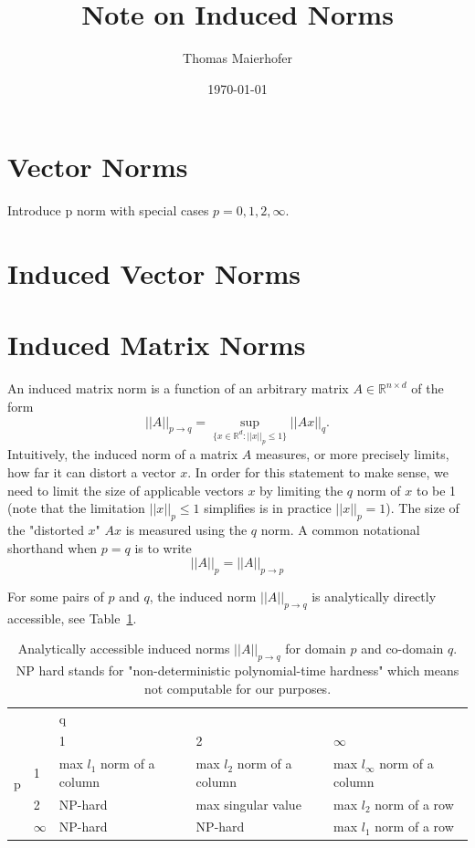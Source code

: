 \documentclass{article}
\title{Note on Induced Norms}
\author{Thomas Maierhofer}
\date{\today}
\begin{document}
\newcommand{\Prob}{\mathbb{P}}
\newcommand{\V}{\mathbb{V}}
\newcommand{\Cov}{\text{Cov}}
\newcommand{\E}{\mathbb{E}}
\newcommand{\R}{\mathbb{R}}
\newcommand{\1}{\mathbb{1}}
\newcommand{\LL}{\mathcal{L}}
\newcommand{\F}{\mathcal{F}}
\newcommand{\iid}{\overset{\text{iid}}{\sim}}
\newcommand{\SUM}{\sum_{i=1}^n}
\newcommand{\PROD}{\prod_{i=1}^n}

\maketitle

\section{Vector Norms}
Introduce p norm with special cases $ p = 0, 1, 2, \infty$.


\section{Induced Vector Norms}

\section{Induced Matrix Norms}
An induced matrix norm is a function of an arbitrary matrix $A \in \R^{n \times d}$ of the form
$$||A||_{p \to q} = \sup_{\{x \in \R^d: ||x||_p \leq 1\}} ||Ax||_q.$$
Intuitively, the induced norm of a matrix $A$ measures, or more precisely limits, how far it can distort a vector $x$.
In order for this statement to make sense, we need to limit the size of applicable vectors $x$ by limiting the $q$ norm of $x$ to be 1 (note that the limitation $||x||_p \leq 1$ simplifies is in practice $||x||_p = 1$). 
The size of the "distorted $x$" $Ax$ is measured using the $q$ norm.
A common notational shorthand when $p = q$ is to write
$$||A||_p = ||A||_{p \to p}$$

For some pairs of $p$ and $q$, the induced norm $||A||_{p \to q}$ is analytically directly accessible, see Table~\ref{tab:induced_norm}. 

\begin{table}[ht]
\caption{Analytically accessible induced norms $||A||_{p \to q}$ for domain $p$ and co-domain $q$. NP hard stands for "non-deterministic polynomial-time hardness" which means not computable for our purposes.}
\begin{tabular}{ll|p{3cm}p{3cm}p{3cm}}
                          & & \multicolumn{3}{l}{\hspace{5cm} q} \\ 
\multirow{4}{*}{p} &                       & 1 & 2  & $\infty$ \\ \cline{2-5}
                          & 1 & max $l_1$ norm of a column & max $l_2$ norm of a column & max $l_\infty$ norm of a column \\
                          & 2                     & NP-hard & max singular value  & max $l_2$ norm of a row \\
                          & $\infty$ & NP-hard & NP-hard & max $l_1$ norm of a row     
\end{tabular}
\label{tab:induced_norm}
\end{table}
\end{document}
